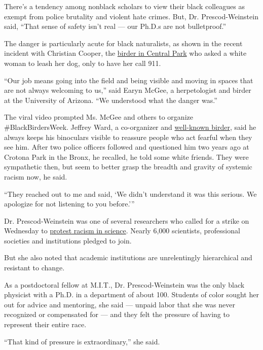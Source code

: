 There's a tendency among nonblack scholars to view their black
colleagues as exempt from police brutality and violent hate crimes. But,
Dr. Prescod-Weinstein said, ``That sense of safety isn't real --- our
Ph.D.s are not bulletproof.''

The danger is particularly acute for black naturalists, as shown in the
recent incident with Christian Cooper, the
\href{https://www.nytimes3xbfgragh.onion/2020/05/27/nyregion/amy-cooper-christian-central-park-video.html}{birder
in Central Park} who asked a white woman to leash her dog, only to have
her call 911.

``Our job means going into the field and being visible and moving in
spaces that are not always welcoming to us,'' said Earyn McGee, a
herpetologist and birder at the University of Arizona. ``We understood
what the danger was.''

The viral video prompted Ms. McGee and others to organize
\#BlackBirdersWeek. Jeffrey Ward, a co-organizer and
\href{https://www.nytimes3xbfgragh.onion/2019/06/28/movies/birding-people-of-color-rolling-stone.html}{well-known
birder}, said he always keeps his binoculars visible to reassure people
who act fearful when they see him. After two police officers followed
and questioned him two years ago at Crotona Park in the Bronx, he
recalled, he told some white friends. They were sympathetic then, but
seem to better grasp the breadth and gravity of systemic racism now, he
said.

``They reached out to me and said, `We didn't understand it was this
serious. We apologize for not listening to you before.'''

Dr. Prescod-Weinstein was one of several researchers who called for a
strike on Wednesday to
\href{https://www.nytimes3xbfgragh.onion/2020/06/10/science/science-diversity-racism-protests.html}{protest
racism in science}. Nearly 6,000 scientists, professional societies and
institutions pledged to join.

But she also noted that academic institutions are unrelentingly
hierarchical and resistant to change.

As a postdoctoral fellow at M.I.T., Dr. Prescod-Weinstein was the only
black physicist with a Ph.D. in a department of about 100. Students of
color sought her out for advice and mentoring, she said --- unpaid labor
that she was never recognized or compensated for --- and they felt the
pressure of having to represent their entire race.

``That kind of pressure is extraordinary,'' she said.

